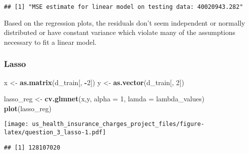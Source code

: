 \documentclass[
]{article}
\newenvironment{Shaded}{\begin{snugshade}}{\end{snugshade}}
\newcommand{\AttributeTok}[1]{\textcolor[rgb]{0.13,0.29,0.53}{#1}}
\newcommand{\DecValTok}[1]{\textcolor[rgb]{0.00,0.00,0.81}{#1}}
\newcommand{\FunctionTok}[1]{\textcolor[rgb]{0.13,0.29,0.53}{\textbf{#1}}}
\newcommand{\NormalTok}[1]{#1}
\newcommand{\OtherTok}[1]{\textcolor[rgb]{0.56,0.35,0.01}{#1}}
\newcommand{\SpecialCharTok}[1]{\textcolor[rgb]{0.81,0.36,0.00}{\textbf{#1}}}
\begin{document}
\begin{verbatim}
## [1] "MSE estimate for linear model on testing data: 40020943.282"
\end{verbatim}

Based on the regression plots, the residuals don't seem independent or
normally distributed or have constant variance which violate many of the
assumptions necessary to fit a linear model.

\hypertarget{lasso}{%
\subsubsection{Lasso}\label{lasso}}

\begin{Shaded}
\begin{Highlighting}[]
\NormalTok{x }\OtherTok{\textless{}{-}} \FunctionTok{as.matrix}\NormalTok{(d\_train[, }\SpecialCharTok{{-}}\DecValTok{2}\NormalTok{])}
\NormalTok{y }\OtherTok{\textless{}{-}} \FunctionTok{as.vector}\NormalTok{(d\_train[, }\DecValTok{2}\NormalTok{])}


\NormalTok{lasso\_reg }\OtherTok{\textless{}{-}} \FunctionTok{cv.glmnet}\NormalTok{(x,y, }\AttributeTok{alpha =} \DecValTok{1}\NormalTok{, }\AttributeTok{lamda =}\NormalTok{ lambda\_values)}
\FunctionTok{plot}\NormalTok{(lasso\_reg)}
\end{Highlighting}
\end{Shaded}

\texttt{[image: us\_health\_insurance\_charges\_project\_files/figure-latex/question\_3\_lasso-1.pdf]}

\begin{Shaded}
\end{Shaded}

\begin{verbatim}
## [1] 128107020
\end{verbatim}
\end{document}
